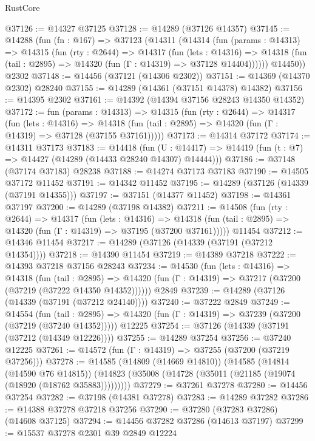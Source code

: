 \begin{lexlean}{RustCore}
\begin{coremodule}
@37126 := @14327 @37125
@37128 := @14289 (@37126 @14357)
@37145 := @14288
    (fun (fn : @167) =>
    @37123
      (@14311
        (@14314
          (fun (params : @14313) =>
          @14315
            (fun (rty : @2644) =>
            @14317
              (fun (lets : @14316) =>
              @14318 (fun (tail : @2895) => @14320 (fun (Γ : @14319) => @37128 @14404))))))
        @14450))
    @2302
@37148 := @14456 (@37121 (@14306 @2302))
@37151 := @14369 (@14370 @2302) @28240
@37155 := @14289 (@14361 (@37151 @14378) @14382)
@37156 := @14395 @2302
@37161 := @14392 (@14394 @37156 @28243 @14350 @14352)
@37172 := fun (params : @14313) =>
  @14315
    (fun (rty : @2644) =>
    @14317
      (fun (lets : @14316) =>
      @14318 (fun (tail : @2895) => @14320 (fun (Γ : @14319) => @37128 (@37155 @37161)))))
@37173 := @14314 @37172
@37174 := @14311 @37173
@37183 := @14418
    (fun (U : @14417) => @14419 (fun (t : @7) => @14427 (@14289 (@14433 @28240 @14307) @14444)))
@37186 := @37148 (@37174 @37183) @28238
@37188 := @14274 @37173 @37183
@37190 := @14505 @37172 @11452
@37191 := @14342 @11452
@37195 := @14289 (@37126 (@14339 (@37191 @14355)))
@37197 := @37151 (@14377 @11452)
@37198 := @14361 @37197
@37200 := @14289 (@37198 @14382)
@37211 := @14508
    (fun (rty : @2644) =>
    @14317
      (fun (lets : @14316) =>
      @14318 (fun (tail : @2895) => @14320 (fun (Γ : @14319) => @37195 (@37200 @37161)))))
    @11454
@37212 := @14346 @11454
@37217 := @14289 (@37126 (@14339 (@37191 (@37212 @14354))))
@37218 := @14390 @11454
@37219 := @14389 @37218
@37222 := @14393 @37218 @37156 @28243
@37234 := @14530
    (fun (lets : @14316) =>
    @14318
      (fun (tail : @2895) =>
      @14320 (fun (Γ : @14319) => @37217 (@37200 (@37219 (@37222 @14350 @14352))))))
    @2849
@37239 := @14289 (@37126 (@14339 (@37191 (@37212 @24140))))
@37240 := @37222 @2849
@37249 := @14554
    (fun (tail : @2895) => @14320 (fun (Γ : @14319) => @37239 (@37200 (@37219 (@37240 @14352)))))
    @12225
@37254 := @37126 (@14339 (@37191 (@37212 (@14349 @12226))))
@37255 := @14289 @37254
@37256 := @37240 @12225
@37261 := @14572 (fun (Γ : @14319) => @37255 (@37200 (@37219 @37256)))
@37278 := @14585
    (@14809 (@14669 @14810))
    (@14585
      (@14814 (@14590 @76 @14815))
      (@14823 (@35008 (@14728 (@35011 (@21185 (@19074 (@18920 (@18762 @35883)))))))))
@37279 := @37261 @37278
@37280 := @14456 @37254
@37282 := @37198 (@14381 @37278)
@37283 := @14289 @37282
@37286 := @14388 @37278 @37218 @37256
@37290 := @37280 (@37283 @37286) (@14608 @37125)
@37294 := @14456 @37282 @37286 (@14613 @37197)
@37299 := @15537 @37278 @2301 @39 @2849 @12224

\end{coremodule}
\end{lexlean}

